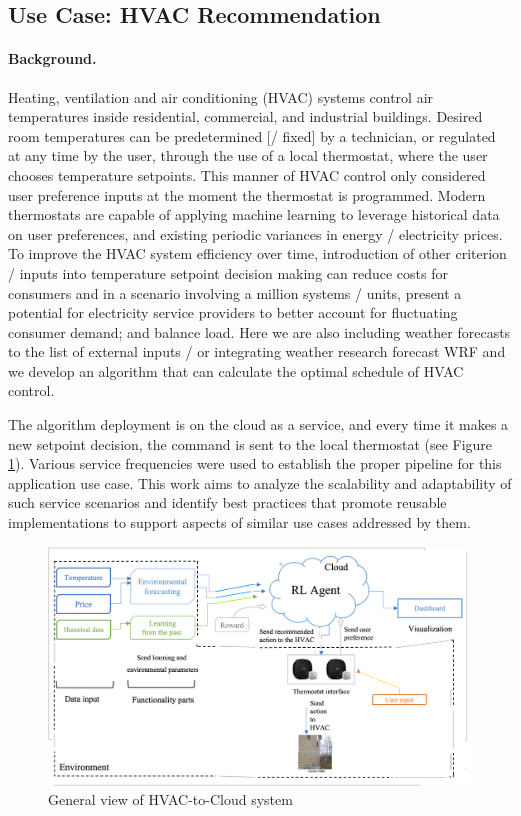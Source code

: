 \subsection{Use Case: HVAC Recommendation}

\paragraph*{Background.}
Heating, ventilation and air conditioning (HVAC) systems control air temperatures inside residential, commercial, and industrial  buildings. 
Desired room temperatures can be predetermined [/ fixed] by a technician, or regulated at any time by the user, through the use of a local thermostat, where the user chooses temperature setpoints. This manner of  HVAC control only considered user preference inputs at the moment the thermostat is programmed. Modern thermostats are capable of applying machine learning to leverage historical data on user preferences, and existing periodic variances in energy / electricity prices. To improve the HVAC system efficiency over time, introduction of other criterion / inputs into temperature setpoint decision making can reduce costs for consumers and in a scenario involving a million systems / units, present a potential for electricity service providers to better account for fluctuating consumer demand; and balance load. Here we are also including weather forecasts to the list of external inputs / or integrating weather research forecast WRF and we develop an algorithm that can calculate the optimal schedule of HVAC control. 

The algorithm deployment is on the cloud as a service, and every time it makes a new setpoint decision, the command is sent to the local thermostat (see Figure \ref{fig:hvac_general}). Various service frequencies were used to establish the proper pipeline for this application use case. This work aims to analyze the scalability and adaptability of such service scenarios and identify best practices that promote reusable implementations to support aspects of similar use cases addressed by them.

\begin{figure}[htb]
\centering\includegraphics[width=1.0\columnwidth]{usecase/hvac-new-arch.png}
\caption{General view of HVAC-to-Cloud system}
\label{fig:hvac_general}
\end{figure}

